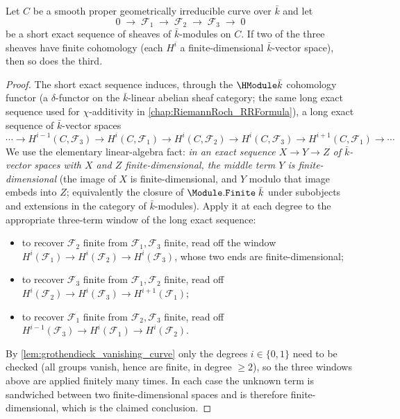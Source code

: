 \begin{lemma}
  \label{lem:HModule_finite_of_ses}
  Let \(C\) be a smooth proper geometrically irreducible curve over
  \(\bar k\) and let
  \[
    0 \;\longrightarrow\; \mathcal F_1 \;\longrightarrow\;
    \mathcal F_2 \;\longrightarrow\; \mathcal F_3 \;\longrightarrow\; 0
  \]
  be a short exact sequence of sheaves of \(\bar k\)-modules on \(C\).
  If two of the three sheaves have finite cohomology (each \(H^i\) a
  finite-dimensional \(\bar k\)-vector space), then so does the third.

\end{lemma}

\begin{proof}
  The short exact sequence induces, through the \(\HModule \bar k\)
  cohomology functor (a \(\delta\)-functor on the \(\bar k\)-linear abelian
  sheaf category; the same long exact sequence used for \(\chi\)-additivity
  in \cref{chap:RiemannRoch_RRFormula}), a long exact sequence of
  \(\bar k\)-vector spaces
  \[
    \cdots \to H^{i-1}(C, \mathcal F_3)
    \to H^{i}(C, \mathcal F_1)
    \to H^{i}(C, \mathcal F_2)
    \to H^{i}(C, \mathcal F_3)
    \to H^{i+1}(C, \mathcal F_1) \to \cdots
  \]
  We use the elementary linear-algebra fact: \emph{in an exact sequence
  \(X \to Y \to Z\) of \(\bar k\)-vector spaces with \(X\) and \(Z\)
  finite-dimensional, the middle term \(Y\) is finite-dimensional}
  (the image of \(X\) is finite-dimensional, and \(Y\) modulo that image
  embeds into \(Z\); equivalently the closure of
  \(\Module.\mathtt{Finite}\;\bar k\) under subobjects and extensions in
  the category of \(\bar k\)-modules). Apply it at each degree to the
  appropriate three-term window of the long exact sequence:
  \begin{itemize}
    \item to recover \(\mathcal F_2\) finite from \(\mathcal F_1,
      \mathcal F_3\) finite, read off the window
      \(H^i(\mathcal F_1) \to H^i(\mathcal F_2) \to
      H^i(\mathcal F_3)\), whose two ends are finite-dimensional;
    \item to recover \(\mathcal F_3\) finite from \(\mathcal F_1,
      \mathcal F_2\) finite, read off
      \(H^i(\mathcal F_2) \to H^i(\mathcal F_3) \to
      H^{i+1}(\mathcal F_1)\);
    \item to recover \(\mathcal F_1\) finite from \(\mathcal F_2,
      \mathcal F_3\) finite, read off
      \(H^{i-1}(\mathcal F_3) \to H^i(\mathcal F_1) \to
      H^i(\mathcal F_2)\).
  \end{itemize}
  By \cref{lem:grothendieck_vanishing_curve} only the degrees
  \(i \in \{0, 1\}\) need to be checked (all groups vanish, hence are
  finite, in degree \(\ge 2\)), so the three windows above are applied
  finitely many times. In each case the unknown term is sandwiched
  between two finite-dimensional spaces and is therefore
  finite-dimensional, which is the claimed conclusion.
\end{proof}

